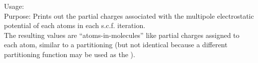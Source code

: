 {
  \noindent
  Usage:   \\[1.0ex]
  Purpose: Prints out the partial charges associated with the
    multipole electrostatic potential of each atoms in each
    s.c.f. iteration. \\[1.0ex]
}
The resulting values are ``atoms-in-molecules'' like partial charges
assigned to each atom, similar to a 
partitioning (but not identical because a different partitioning
function may be used as the ). 




